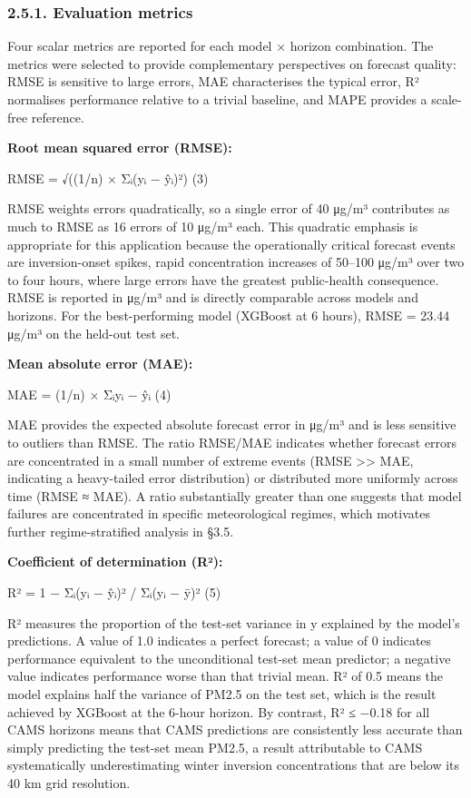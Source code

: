 \subsubsection{2.5.1. Evaluation metrics}\label{evaluation-metrics}

Four scalar metrics are reported for each model × horizon combination. The metrics were selected to provide complementary perspectives on forecast quality: RMSE is sensitive to large errors, MAE characterises the typical error, R² normalises performance relative to a trivial baseline, and MAPE provides a scale-free reference.

\textbf{Root mean squared error (RMSE):}

RMSE = √((1/n) × Σᵢ(yᵢ − ŷᵢ)²) (3)

RMSE weights errors quadratically, so a single error of 40 μg/m³ contributes as much to RMSE as 16 errors of 10 μg/m³ each. This quadratic emphasis is appropriate for this application because the operationally critical forecast events are inversion-onset spikes, rapid concentration increases of 50--100 μg/m³ over two to four hours, where large errors have the greatest public-health consequence. RMSE is reported in μg/m³ and is directly comparable across models and horizons. For the best-performing model (XGBoost at 6 hours), RMSE = 23.44 μg/m³ on the held-out test set.

\textbf{Mean absolute error (MAE):}

MAE = (1/n) × Σᵢ\textbar yᵢ − ŷᵢ\textbar{} (4)

MAE provides the expected absolute forecast error in μg/m³ and is less sensitive to outliers than RMSE. The ratio RMSE/MAE indicates whether forecast errors are concentrated in a small number of extreme events (RMSE \textgreater\textgreater{} MAE, indicating a heavy-tailed error distribution) or distributed more uniformly across time (RMSE ≈ MAE). A ratio substantially greater than one suggests that model failures are concentrated in specific meteorological regimes, which motivates further regime-stratified analysis in §3.5.

\textbf{Coefficient of determination (R²):}

R² = 1 − Σᵢ(yᵢ − ŷᵢ)² / Σᵢ(yᵢ − ȳ)² (5)

R² measures the proportion of the test-set variance in y explained by the model's predictions. A value of 1.0 indicates a perfect forecast; a value of 0 indicates performance equivalent to the unconditional test-set mean predictor; a negative value indicates performance worse than that trivial mean. R² of 0.5 means the model explains half the variance of PM2.5 on the test set, which is the result achieved by XGBoost at the 6-hour horizon. By contrast, R² ≤ −0.18 for all CAMS horizons means that CAMS predictions are consistently less accurate than simply predicting the test-set mean PM2.5, a result attributable to CAMS systematically underestimating winter inversion concentrations that are below its 40 km grid resolution.

